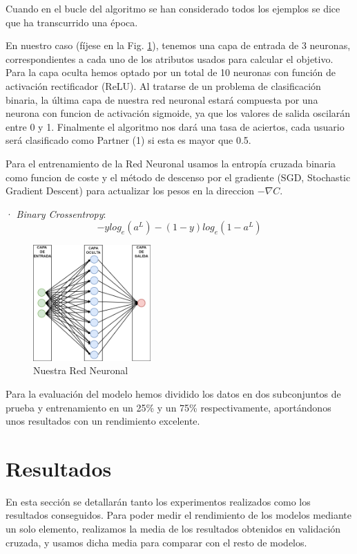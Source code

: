 \documentclass[conference,a4paper]{IEEEtran}
\begin{document}
Cuando en el bucle del algoritmo se han considerado todos los ejemplos se dice que ha transcurrido una época.

En nuestro caso (fíjese en la Fig. \ref{fig:red}), tenemos una capa de entrada de 3 neuronas, correspondientes a cada uno de los atributos usados para calcular el objetivo. Para la capa oculta hemos optado por un total de 10 neuronas con función de activación rectificador (ReLU). Al tratarse de un problema de clasificación binaria, la última capa de nuestra red neuronal estará compuesta por una neurona con funcion de activación sigmoide, ya que los valores de salida oscilarán entre 0 y 1. Finalmente el algoritmo nos dará una tasa de aciertos, cada usuario será clasificado como Partner (1) si esta es mayor que 0.5.

Para el entrenamiento de la Red Neuronal usamos la entropía cruzada binaria como funcion de coste  y el método de descenso por el gradiente (SGD, Stochastic Gradient Descent) para actualizar los pesos en la direccion $-\nabla C$.

· \emph{Binary Crossentropy}:
\begin{equation}
 -y log_e(a^L) - (1-y) log_e(1 - a^L)
\end{equation}

\begin{figure}
    \centering
    \includegraphics[width=0.4\textwidth]{./ImagenesMemoria/RedNeuronal}
    \caption{\label{fig:red}Nuestra Red Neuronal}
\end{figure}

Para la evaluación del modelo hemos dividido los datos en dos subconjuntos de prueba y entrenamiento en un 25\% y un 75\% respectivamente, aportándonos unos resultados con un rendimiento excelente.


\section{Resultados}


En esta sección se detallarán tanto los experimentos realizados como los
resultados conseguidos. Para poder medir el rendimiento de los modelos mediante un solo elemento, realizamos la media de los resultados obtenidos en validación cruzada, y usamos dicha media para comparar con el resto de modelos.
\end{document}
